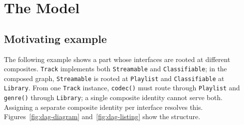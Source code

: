 \documentclass[acmsmall,nonacm]{acmart}
\theoremstyle{acmplain}
\theoremstyle{acmdefinition}
\newcommand{\code}[1]{\texttt{#1}}
\begin{document}
\section{The Model}
\label{sec:model}

\subsection*{Motivating example}

The following example shows a part whose interfaces are rooted at different
composites. \code{Track} implements both \code{Streamable} and
\code{Classifiable}; in the composed graph, \code{Streamable} is rooted at
\code{Playlist} and \code{Classifiable} at \code{Library}. From one
\code{Track} instance, \code{codec()} must route through \code{Playlist} and
\code{genre()} through \code{Library}; a single composite identity cannot serve
both. Assigning a separate composite identity per interface resolves this.
Figures~\ref{fig:dag-diagram} and~\ref{fig:dag-listing} show the structure.
\end{document}
